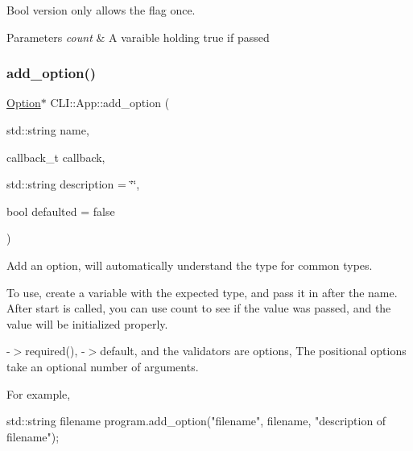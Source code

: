Bool version only allows the flag once. 


\begin{DoxyParams}{Parameters}
{\em count} & A varaible holding true if passed \\
\hline
\end{DoxyParams}
\mbox{\label{class_c_l_i_1_1_app_a6e8e118fcc2a06f9d21c6b3d84bb0af4}} 
\subsubsection{\texorpdfstring{add\+\_\+option()}{add\_option()}\hspace{0.1cm}{\footnotesize\ttfamily [1/3]}}
{\footnotesize\ttfamily \hyperlink{class_c_l_i_1_1_option}{Option}$\ast$ C\+L\+I\+::\+App\+::add\+\_\+option (\begin{DoxyParamCaption}\item[{std\+::string}]{name,  }\item[{callback\+\_\+t}]{callback,  }\item[{std\+::string}]{description = {\ttfamily \char`\"{}\char`\"{}},  }\item[{bool}]{defaulted = {\ttfamily false} }\end{DoxyParamCaption})\hspace{0.3cm}{\ttfamily [inline]}}



Add an option, will automatically understand the type for common types. 

To use, create a variable with the expected type, and pass it in after the name. After start is called, you can use count to see if the value was passed, and the value will be initialized properly.

-\/$>$required(), -\/$>$default, and the validators are options, The positional options take an optional number of arguments.

For example, \begin{DoxyVerb}std::string filename
program.add_option("filename", filename, "description of filename");\end{DoxyVerb}
 \mbox{\label{class_c_l_i_1_1_app_a5ba8a993d48f76f98674193e77835bc6}} 
